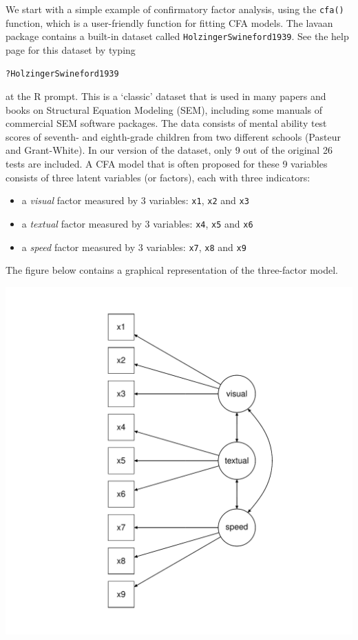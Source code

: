 We start with a simple example of confirmatory factor analysis, using
the \texttt{cfa()} function, which is a user-friendly function for
fitting CFA models. The lavaan package contains a built-in dataset
called \texttt{HolzingerSwineford1939}. See the help page for this
dataset by typing

\begin{verbatim}
?HolzingerSwineford1939
\end{verbatim}

at the R prompt. This is a `classic' dataset that is used in many papers
and books on Structural Equation Modeling (SEM), including some manuals
of commercial SEM software packages. The data consists of mental ability
test scores of seventh- and eighth-grade children from two different
schools (Pasteur and Grant-White). In our version of the dataset, only 9
out of the original 26 tests are included. A CFA model that is often
proposed for these 9 variables consists of three latent variables (or
factors), each with three indicators:

\begin{itemize}
\itemsep1pt\parskip0pt
\item
  a \emph{visual} factor measured by 3 variables: \texttt{x1},
  \texttt{x2} and \texttt{x3}
\item
  a \emph{textual} factor measured by 3 variables: \texttt{x4},
  \texttt{x5} and \texttt{x6}
\item
  a \emph{speed} factor measured by 3 variables: \texttt{x7},
  \texttt{x8} and \texttt{x9}
\end{itemize}

The figure below contains a graphical representation of the three-factor
model.

\includegraphics{figure/cfa.pdf}

